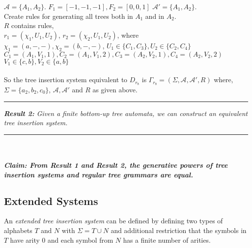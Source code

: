 \begin{example}
$\mathcal{A} =\{A_1,A_2\}$. $F_1=[-1,-1,-1],F_2=[0,0,1]$
$\mathcal{A}' =\{A_1,A_2\}$.\\

Create rules for generating all trees both in $A_1$ and in $A_2$.\\
$R$ contains rules,\\
   $r_1=(\chi _1,U_1,U_2)$,
   $r_2=(\chi _2, U_1,U_2)$,
  where \\
   $\chi _1=(a,-,-),\chi _2=(b,-,-)$,
   $U_1\in \{C_1,C_3\},U_2\in \{C_2,C_4\}$\\%
    $C_1 =(A_1,V_1,1),C_2=(A_1,V_1,2),C_3=(A_2,V_2,1),C_4=(A_2,V_2,2)$\\
    $V_1\in \{c,b\},V_2\in \{a,b\}$\\\\
So the tree insertion system equivalent to $D_{r_{8}}$ is            
$\Gamma _{r_{8}} = (\Sigma ,\mathcal{A},\mathcal{A} ',R)$ where,\\

    $\Sigma =\{a_2,b_2,c_0\}$,  
$\mathcal{A} ,\mathcal{A}'$ and $R$ as given above.\\

\noindent \rule{\textwidth}{1pt}
\end{example}    
\emph{\textbf{Result 2:} Given a finite bottom-up tree automata, we can construct an equivalent tree insertion system.}\\
\noindent \rule{\textwidth}{1pt}\\\\
\emph{\textbf{Claim: From Result 1 and Result 2, the generative powers of tree insertion systems and regular tree grammars are equal.}}\\
\subsection{Extended Systems}
An \emph{extended tree insertion system} can be defined by defining two types of alphabets $T$ and $N$ with $\Sigma = T\cup N$ 
and additional restriction that
the symbols in $T$ have arity 0 and each symbol from $N$ has a finite number of arities.

